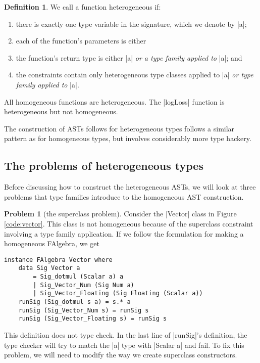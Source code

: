 \documentclass[preprint]{sigplanconf}
\theoremstyle{definition}
\newtheorem{problem}{Problem}
\newtheorem{defn}{Definition}
\begin{document}
\begin{defn}
We call a function heterogeneous if:
\begin{enumerate}
\item
there is exactly one type variable in the signature, which we denote by |a|;
\item
each of the function's parameters is either
\item
the function's return type is either |a| \emph{or a type family applied to} |a|; and
\item
the constraints contain only heterogeneous type classes applied to |a| \emph{or type family applied to} |a|.
\end{enumerate}
All homogeneous functions are heterogeneous.
The |logLoss| function is heterogeneous but not homogeneous.
\end{defn}

The construction of ASTs follows for heterogeneous types follows a similar pattern as for homogeneous types, but involves considerably more type hackery.

\subsection{The problems of heterogeneous types}
Before discussing how to construct the heterogeneous ASTs,
we will look at three problems that type families introduce to the homogeneous AST construction.

\begin{problem}[the superclass problem]
Consider the |Vector| class in Figure \ref{code:vector}.
This class is not homogeneous because of the superclass constraint involving a type family application.
If we follow the formulation for making a homogeneous FAlgebra, we get
\begin{lstlisting}
instance FAlgebra Vector where
    data Sig Vector a
        = Sig_dotmul (Scalar a) a
        | Sig_Vector_Num (Sig Num a)
        | Sig_Vector_Floating (Sig Floating (Scalar a))
    runSig (Sig_dotmul s a) = s.* a
    runSig (Sig_Vector_Num s) = runSig s
    runSig (Sig_Vector_Floating s) = runSig s
\end{lstlisting}
This definition does not type check.
In the last line of |runSig|'s definition,
the type checker will try to match the |a| type with |Scalar a| and fail.
To fix this problem, we will need to modify the way we create superclass constructors.
\end{problem}
\end{document}
